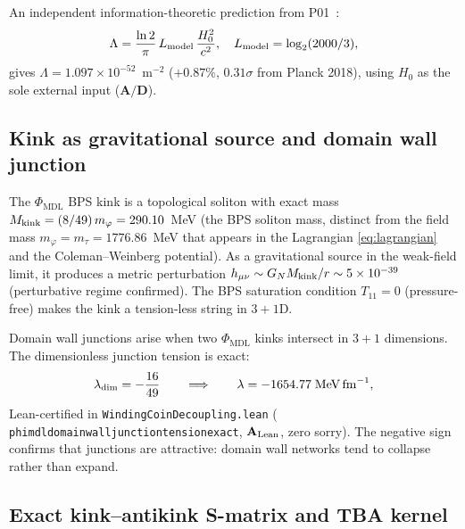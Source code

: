\documentclass[11pt]{article}
\theoremstyle{remark}
\newcommand{\PHIMDL}{\Phi_{\mathrm{MDL}}}
\newcommand{\lean}[1]{%
  \penalty-100
  \begingroup\def\_{\textunderscore\allowbreak}\texttt{#1}\endgroup}
\newcommand{\Mkink}{M_{\rm kink}}
\newcommand{\CatAL}{\ensuremath{\textbf{A}_{\rm Lean}}}
\newcommand{\CatAD}{\textbf{A/D}}
\begin{document}
An independent information-theoretic prediction from P01~\cite{Spivack2026_SM_UGP}:
\begin{equation}
  \Lambda = \frac{\ln 2}{\pi}\,L_{\rm model}\,\frac{H_0^2}{c^2},
  \quad L_{\rm model} = \log_2(2000/3),
  \label{eq:lambda_p01}
\end{equation}
gives $\Lambda = 1.097\times10^{-52}$~m$^{-2}$ ($+0.87\%$, $0.31\sigma$
from Planck 2018), using $H_0$ as the sole external input ($\CatAD$).

\subsection{Kink as gravitational source and domain wall junction}

The $\PHIMDL$ BPS kink is a topological soliton with exact mass
$\Mkink = (8/49)\,m_\varphi = 290.10$~MeV (the BPS soliton mass, distinct from the
field mass $m_\varphi = m_\tau = 1776.86$~MeV that appears in the Lagrangian
\eqref{eq:lagrangian} and the Coleman--Weinberg potential).
As a gravitational source in the weak-field limit,
it produces a metric perturbation $h_{\mu\nu} \sim G_N \Mkink/r \sim
5\times10^{-39}$ (perturbative regime confirmed).  The BPS saturation
condition $T_{11}=0$ (pressure-free) makes the kink a tension-less string
in $3+1$D.

Domain wall junctions arise when two $\PHIMDL$ kinks intersect in
$3+1$ dimensions.  The dimensionless junction tension is exact:
\begin{equation}
  \lambda_{\rm dim} = -\frac{16}{49}
  \qquad\Longrightarrow\qquad
  \lambda = -1654.77\;\text{MeV}\,\text{fm}^{-1},
  \label{eq:junction_tension}
\end{equation}
Lean-certified in \lean{WindingCoinDecoupling.lean}
(\lean{phimdl\_domain\_wall\_junction\_tension\_exact}, $\CatAL$, zero sorry).
The negative sign confirms that junctions are attractive: domain wall networks
tend to collapse rather than expand.

\subsection{Exact kink--antikink S-matrix and TBA kernel}
\label{ssec:smatrix}
\end{document}

